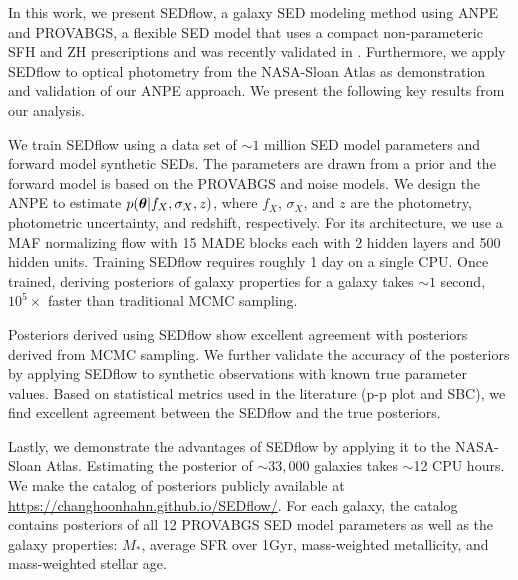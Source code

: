In this work, we present {\sc SEDflow}, a galaxy SED modeling method using ANPE
and PROVABGS, a flexible SED model that uses a compact non-parameteric SFH and
ZH prescriptions and was recently validated in \cite{hahn2022}.
Furthermore, we apply {\sc SEDflow} to optical photometry from the NASA-Sloan
Atlas as demonstration and validation of our ANPE approach.  
We present the following key results from our analysis. \vspace{2mm}
\begin{compactitem}
    \item We train {\sc SEDflow} using a data set of ${\sim}1$ million SED
        model parameters and forward model synthetic SEDs.
        The parameters are drawn from a prior and the forward model is based on
        the PROVABGS and noise models. 
        We design the ANPE to estimate $p(\boldsymbol{\theta} | f_X, \sigma_X, z)$, where
        $f_X$, $\sigma_X$, and $z$ are the photometry, photometric uncertainty,
        and redshift, respectively. 
        For its architecture, we use a MAF normalizing flow with 15 MADE blocks
        each with 2 hidden layers and 500 hidden units.
        Training {\sc SEDflow} requires roughly 1 day on a single CPU. 
        Once trained, deriving posteriors of galaxy properties for a galaxy
        takes ${\sim}1$ second, $10^5\times$ faster than traditional MCMC sampling. 
    \item Posteriors derived using {\sc SEDflow} show excellent agreement with
        posteriors derived from MCMC sampling. 
        We further validate the accuracy of the posteriors by applying  {\sc
        SEDflow} to synthetic observations with known true parameter values.  
        Based on statistical metrics used in the literature (p-p plot and SBC),
        we find excellent agreement between the {\sc SEDflow} and the true
        posteriors. 
    \item Lastly, we demonstrate the advantages of {\sc SEDflow} by applying it
        to the NASA-Sloan Atlas.
        Estimating the posterior of ${\sim}33,000$ galaxies takes $\sim$12 CPU
        hours.
        We make the catalog of posteriors publicly available at
        \url{https://changhoonhahn.github.io/SEDflow/}. 
        For each galaxy, the catalog contains posteriors of all 12 PROVABGS
        SED model parameters as well as the galaxy properties: $M_*$, 
        average SFR over 1Gyr, mass-weighted metallicity, and mass-weighted
        stellar age. \vspace{2mm}
\end{compactitem}

